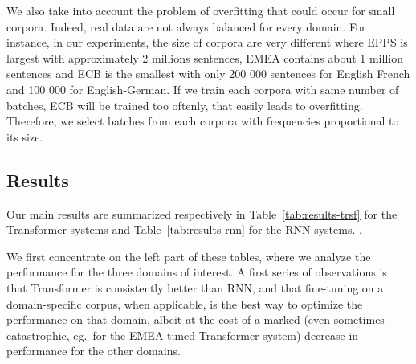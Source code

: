 \documentclass[11pt,a4paper]{article}
\newcommand{\fyTodo}[1]{\Todo[FY:]{\textcolor{orange}{#1}}}
\begin{document}
We also take into account the problem of overfitting that could occur for small corpora. Indeed, real data are not always balanced for every domain. For instance, in our experiments, the size of corpora are very different where EPPS is largest with approximately 2 millions sentences, EMEA contains about 1 million sentences and ECB is the smallest with only 200 000 sentences for English French and 100 000 for English-German. If we train each corpora with same number of batches, ECB will be trained too oftenly, that easily leads to overfitting. Therefore, we select batches from each corpora with frequencies proportional to its size. \fyTodo{Refs on this ? or contrast ?}

\subsection{Results}


Our main results are summarized respectively in Table~\ref{tab:results-trsf} for the Transformer systems and Table~\ref{tab:results-rnn} for the RNN systems. \fyTodo{Check missing numbers in Table}.

We first concentrate on the left part of these tables, where we analyze the performance for the three domains of interest. A first series of observations is that Transformer is consistently better than RNN, and that fine-tuning on a domain-specific corpus, when applicable, is the best way to optimize the performance on that domain, albeit at the cost of a marked (even sometimes catastrophic, eg.\ for the EMEA-tuned Transformer system) decrease in performance for the other domains. 
\end{document}
